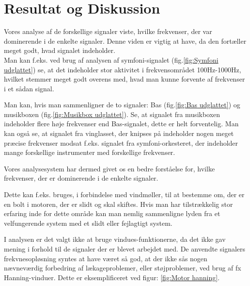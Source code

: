 \chapter{Resultat og Diskussion}\label{ch:Resultat og Diskussion}

Vores analyse af de forskellige signaler viste, hvilke frekvenser, der var dominerende i de enkelte signaler. Denne viden er vigtig at have, da den fortæller meget godt, hvad signalet indeholder. \\Man kan f.eks. ved brug af analysen af symfoni-signalet (fig.\ref{fig:Symfoni udglattet}) se, at det indeholder stor aktivitet i frekvensområdet 100Hz-1000Hz, hvilket stemmer meget godt overens med, hvad man kunne forvente af frekvenser i et sådan signal.

Man kan, hvis man sammenligner de to signaler: Bas (fig.\ref{fig:Bas udglattet}) og musikboxen (fig.\ref{fig:Musikbox udglattet}). Se, at signalet fra musikboxen indeholder flere høje frekvenser end Bas-signalet, dette er helt forventelig. Man kan også se, at signalet fra vinglasset, der knipses på indeholder nogen meget præcise frekvenser modsat f.eks. signalet fra symfoni-orkesteret, der indeholder mange forskellige instrumenter med forskellige frekvenser.

Vores analysesystem har dermed givet os en bedre forståelse for, hvilke frekvenser, der er dominerende i de enkelte signaler. 

Dette kan f.eks. bruges, i forbindelse med vindmøller, til at bestemme om, der er en bolt i motoren, der er slidt og skal skiftes. Hvis man har tilstrækkelig stor erfaring inde for dette område kan man nemlig sammenligne lyden fra et velfungerende system med et slidt eller fejlagtigt system.

I analysen er det valgt ikke at bruge vindues-funktionerne, da det ikke gav mening i forhold til de signaler der er blevet arbejdet med. De anvendte signalers frekvnesopløsning syntes at have været så god, at der ikke sås nogen nævneværdig forbedring af lækageproblemer, eller støjproblemer, ved brug af  fx Hanning-vinduer. Dette er eksemplificeret ved figur: \ref{fig:Motor hanning}.
